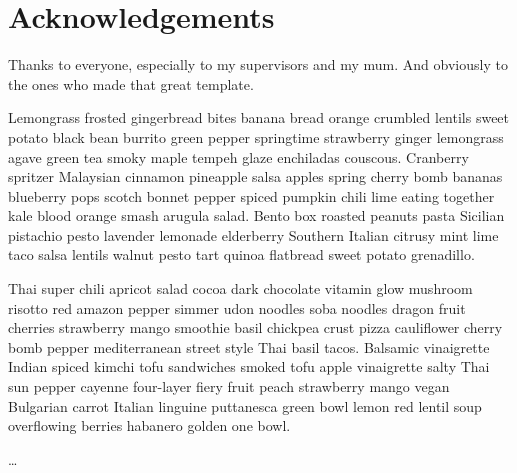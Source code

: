 
\chapter*{Acknowledgements}


Thanks to everyone, especially to my supervisors and my mum.
And obviously to the ones who made that great template.

Lemongrass frosted gingerbread bites banana bread orange crumbled lentils sweet potato black bean burrito green pepper springtime strawberry ginger lemongrass agave green tea smoky maple tempeh glaze enchiladas couscous. Cranberry spritzer Malaysian cinnamon pineapple salsa apples spring cherry bomb bananas blueberry pops scotch bonnet pepper spiced pumpkin chili lime eating together kale blood orange smash arugula salad. Bento box roasted peanuts pasta Sicilian pistachio pesto lavender lemonade elderberry Southern Italian citrusy mint lime taco salsa lentils walnut pesto tart quinoa flatbread sweet potato grenadillo.

Thai super chili apricot salad cocoa dark chocolate vitamin glow mushroom risotto red amazon pepper simmer udon noodles soba noodles dragon fruit cherries strawberry mango smoothie basil chickpea crust pizza cauliflower cherry bomb pepper mediterranean street style Thai basil tacos. Balsamic vinaigrette Indian spiced kimchi tofu sandwiches smoked tofu apple vinaigrette salty Thai sun pepper cayenne four-layer fiery fruit peach strawberry mango vegan Bulgarian carrot Italian linguine puttanesca green bowl lemon red lentil soup overflowing berries habanero golden one bowl.

\ldots
